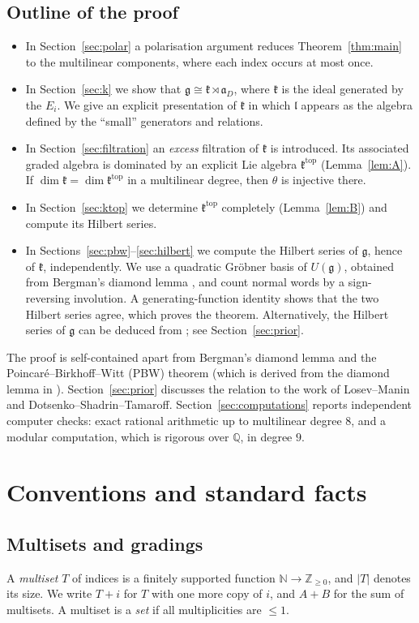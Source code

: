 \documentclass[11pt]{amsart}
\theoremstyle{definition}
\theoremstyle{remark}
\newcommand{\N}{\mathbb{N}}
\newcommand{\Q}{\mathbb{Q}}
\newcommand{\g}{\mathfrak{g}}
\newcommand{\lie}{\mathfrak{l}}
\newcommand{\kr}{\mathfrak{k}}
\newcommand{\ktop}{\mathfrak{k}^{\mathrm{top}}}
\newcommand{\af}{\mathfrak{a}}
\begin{document}
\subsection*{Outline of the proof}
\begin{itemize}
\item In Section~\ref{sec:polar} a polarisation argument reduces Theorem~\ref{thm:main} to the multilinear components, where each index occurs at most once.
\item In Section~\ref{sec:k} we show that $\g\cong\kr\rtimes\af_D$, where $\kr$ is the ideal generated by the $E_i$. We give an explicit presentation of $\kr$ in which $\lie$ appears as the algebra defined by the ``small'' generators and relations.
\item In Section~\ref{sec:filtration} an \emph{excess} filtration of $\kr$ is introduced. Its associated graded algebra is dominated by an explicit Lie algebra $\ktop$ (Lemma~\ref{lem:A}). If $\dim\kr=\dim\ktop$ in a multilinear degree, then $\theta$ is injective there.
\item In Section~\ref{sec:ktop} we determine $\ktop$ completely (Lemma~\ref{lem:B}) and compute its Hilbert series.
\item In Sections~\ref{sec:pbw}--\ref{sec:hilbert} we compute the Hilbert series of $\g$, hence of $\kr$, independently. We use a quadratic Gr\"obner basis of $U(\g)$, obtained from Bergman's diamond lemma \cite{Ber}, and count normal words by a sign-reversing involution. A generating-function identity shows that the two Hilbert series agree, which proves the theorem. Alternatively, the Hilbert series of $\g$ can be deduced from \cite{LM,DST}; see Section~\ref{sec:prior}.
\end{itemize}
The proof is self-contained apart from Bergman's diamond lemma \cite[Theorem~1.2]{Ber} and the Poincar\'e--Birkhoff--Witt (PBW) theorem (which is derived from the diamond lemma in \cite[\S3]{Ber}). Section~\ref{sec:prior} discusses the relation to the work of Losev--Manin and Dotsenko--Shadrin--Tamaroff. Section~\ref{sec:computations} reports independent computer checks: exact rational arithmetic up to multilinear degree $8$, and a modular computation, which is rigorous over $\Q$, in degree $9$.

\section{Conventions and standard facts}\label{sec:conv}

\subsection{Multisets and gradings}
A \emph{multiset} $T$ of indices is a finitely supported function $\N\to\mathbb{Z}_{\ge0}$, and $|T|$ denotes its size. We write $T+i$ for $T$ with one more copy of $i$, and $A+B$ for the sum of multisets. A multiset is a \emph{set} if all multiplicities are $\le1$.
\end{document}
